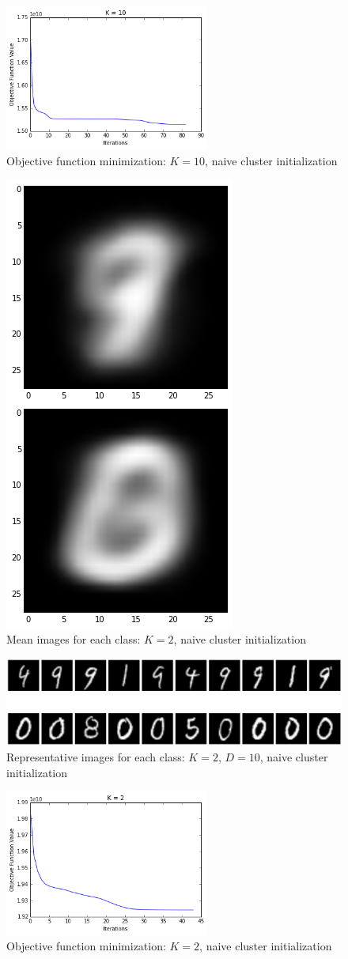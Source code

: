 \documentclass[submit]{harvardml}
\begin{document}
\begin{figure}
	\centering
	\includegraphics[width=0.6\textwidth]{output_12_0.png}
	\caption{Objective function minimization: $K = 10$, naive cluster initialization }
\end{figure}

%

\begin{figure}
	\centering
	\includegraphics[height=0.4\textwidth]{output_14_0.png}
	\caption{Mean images for each class: $K = 2$, naive cluster initialization }
\end{figure}

\begin{figure}
	\centering
	\includegraphics[width=1.0\textwidth]{output_14_1.png}
	\caption{Representative images for each class: $K = 2$, $D = 10$, naive cluster initialization }
\end{figure}

\begin{figure}
	\centering
	\includegraphics[width=0.6\textwidth]{output_15_0.png}
	\caption{Objective function minimization: $K = 2$, naive cluster initialization }
\end{figure}
\end{document}
